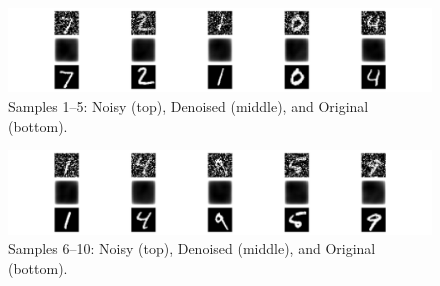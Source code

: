 \begin{figure}[htbp]
  \centering
  \includegraphics[width=\linewidth]{figures/supp_denoised_1.png}
  \caption{Samples 1–5: Noisy (top), Denoised (middle), and Original (bottom).}
\end{figure}

\vspace{0.5cm}

\begin{figure}[htbp]
  \centering
  \includegraphics[width=\linewidth]{figures/supp_denoised_2.png}
  \caption{Samples 6–10: Noisy (top), Denoised (middle), and Original (bottom).}
\end{figure}